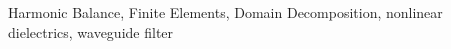 \documentclass[journal]{IEEEtran}
\begin{document}
\begin{IEEEkeywords}
Harmonic Balance, Finite Elements, Domain Decomposition, nonlinear dielectrics, waveguide filter
\end{IEEEkeywords}






%
\IEEEpeerreviewmaketitle
\end{document}
